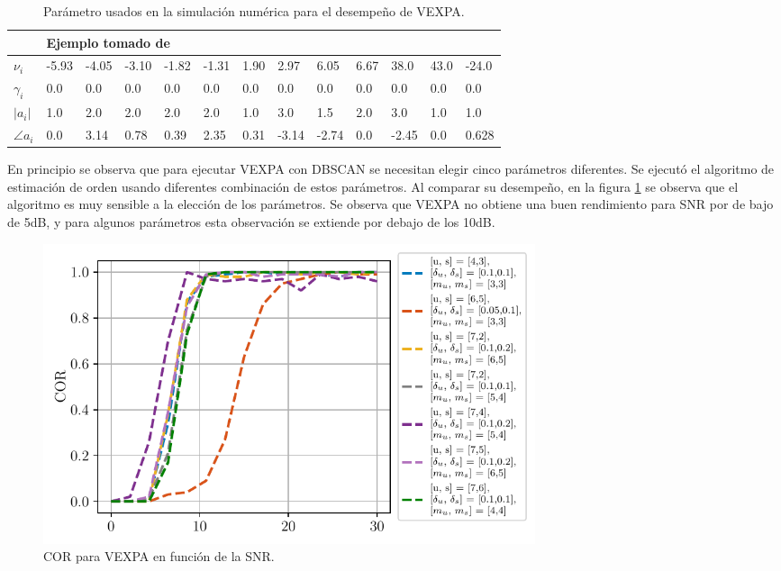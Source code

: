 		\begin{table}[ht]
			\centering
			\begin{tabular}{l|llllllllllll}
					& \multicolumn{12}{l}{Ejemplo tomado de \cite{BRIANI2020}}  \\ \hline
				$\nu_i$      & -5.93  & -4.05   & -3.10   & -1.82  & -1.31        & 1.90   & 2.97    & 6.05    & 6.67   & 
				38.0         & 43.0   & -24.0 \\
				$\gamma_i$   & 0.0    & 0.0     & 0.0     & 0.0    & 0.0          & 0.0    & 0.0     & 0.0     & 0.0    & 
				0.0          & 0.0    & 0.0 \\
				$|a_i|$      & 1.0    & 2.0     & 2.0     & 2.0    & 2.0          & 1.0    & 3.0     & 1.5     & 2.0    &
				3.0          & 1.0    & 1.0    \\
				$\angle a_i$ & 0.0    & 3.14    & 0.78    & 0.39   &
				2.35         & 0.31   & -3.14   & -2.74   & 0.0    &
				-2.45        & 0.0    & 0.628        \\ \hline
			\end{tabular}
			\caption{Parámetro usados en la simulación numérica para el desempeño de VEXPA.}
			\label{Tab:vexpa_parameters}
		\end{table}
	
		En principio se observa que para ejecutar VEXPA con DBSCAN se necesitan elegir cinco parámetros diferentes. Se ejecutó el algoritmo de estimación de orden usando diferentes combinación de estos parámetros. Al comparar su desempeño, en la figura \ref{fig:COR_example_vexpa} se observa que el algoritmo es muy sensible a la elección de los parámetros. Se observa que VEXPA no obtiene una buen rendimiento para SNR por de bajo de 5dB, y para algunos parámetros esta observación se extiende por debajo de los 10dB. 
		
		\begin{figure}[ht]
			\centering
			\includegraphics[width = 0.7\textwidth]{Figuras/vexpa_example.pdf}
			\caption{COR para VEXPA en función de la SNR.}
			\label{fig:COR_example_vexpa}
		\end{figure}
		
